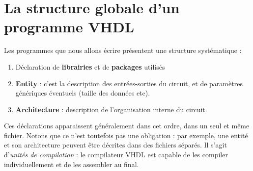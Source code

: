 \section{La structure globale d'un programme VHDL}

Les programmes que nous allons écrire présentent une structure systématique :
\begin{enumerate}
  \item Déclaration de \textbf{librairies} et de \textbf{packages} utilisés
  \item \textbf{Entity} : c'est la description des entrées-sorties du circuit, et de paramètres génériques éventuels (taille des données etc).
  \item \textbf{Architecture} : description de l'organisation interne du circuit.
\end{enumerate}
Ces déclarations apparaissent généralement dans cet ordre, dans un seul et même fichier. Notons que ce n'est toutefois pas une obligation : par exemple, une entité et son architecture
peuvent être décrites dans des fichiers séparés. Il s'agit d'{\it unités de compilation} : le compilateur VHDL est capable de les compiler individuellement et de les assembler au final.

